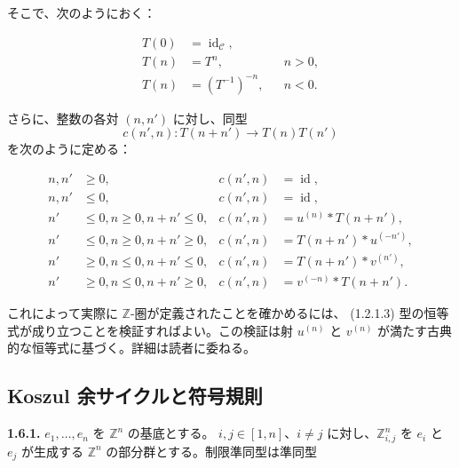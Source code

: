 \clearpage
{}%
そこで、次のようにおく：

\begin{equation}
  \begin{aligned}
    T(0)&=\operatorname{id}_{\mathcal C},\\
    T(n)&=T^n, && n>0,\\
    T(n)&=(T^{-1})^{-n}, && n<0.
  \end{aligned}
  \tag{1.5.14.3}
\end{equation}

さらに、整数の各対 $(n,n')$ に対し、同型
\[
  c(n',n)\colon T(n+n')\longrightarrow T(n)T(n')
\]
を次のように定める：

\begin{equation}
  \begin{aligned}
    n,n'&\geq 0,
      &c(n',n)&=\operatorname{id},\\
    n,n'&\leq 0,
      &c(n',n)&=\operatorname{id},\\
    n'&\leq 0, n\geq 0, n+n'\leq 0,
      &c(n',n)&=u^{(n)}\mathbin{*}T(n+n'),\\
    n'&\leq 0, n\geq 0, n+n'\geq 0,
      &c(n',n)&=T(n+n')\mathbin{*}u^{(-n')},\\
    n'&\geq 0, n\leq 0, n+n'\leq 0,
      &c(n',n)&=T(n+n')\mathbin{*}v^{(n')},\\
    n'&\geq 0, n\leq 0, n+n'\geq 0,
      &c(n',n)&=v^{(-n)}\mathbin{*}T(n+n').
  \end{aligned}
  \tag{1.5.14.4}
\end{equation}

これによって実際に $\mathbb Z$-圏が定義されたことを確かめるには、
(1.2.1.3) 型の恒等式が成り立つことを検証すればよい。この検証は射
$u^{(n)}$ と $v^{(n)}$ が満たす古典的な恒等式に基づく。詳細は読者に委ねる。

\subsection{Koszul 余サイクルと符号規則}

\noindent\textbf{1.6.1.}\quad
$e_1,\ldots,e_n$ を $\mathbb Z^n$ の基底とする。
$i,j\in[1,n]$、$i\neq j$ に対し、$\mathbb Z^n_{i,j}$ を $e_i$ と
$e_j$ が生成する $\mathbb Z^n$ の部分群とする。制限準同型は準同型

